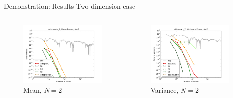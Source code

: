 \documentclass[t,9pt,svgnames]{beamer}
\begin{document}
\begin{frame}{Demonstration: Results}
  Two-dimension case
  \begin{columns}
    \begin{column}{0.5\textwidth}
      \begin{figure}
        \centering
        \includegraphics[width=\linewidth]{./attenuate/attenuate_2_mean_errs}
        \caption{Mean, $N=2$}
      \end{figure}
    \end{column}
    \begin{column}{0.5\textwidth}
      \begin{figure}
        \centering
        \includegraphics[width=\linewidth]{./attenuate/attenuate_2_variance_errs}
        \caption{Variance, $N=2$}
      \end{figure}
    \end{column}
  \end{columns}
\end{frame}
\end{document}
